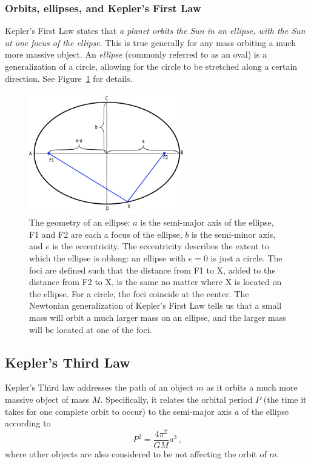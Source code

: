 \subsubsection{Orbits, ellipses, and Kepler's First Law}
Kepler's First Law states that \textit{a planet orbits the Sun in an ellipse, with the Sun at one focus of the ellipse}. This is true generally for any mass orbiting a much more massive object. An \textit{ellipse} (commonly referred to as an oval) is a generalization of a circle, allowing for the circle to be stretched along a certain direction. See Figure~\ref{gc:fig:ellipse} for details.

\begin{figure}
	\centering
	\includegraphics[width=0.6\textwidth]{galactic-center/ellipse.png}
	\caption{The geometry of an ellipse: $a$ is the semi-major axis of the ellipse, F1 and F2 are each a
		focus of the ellipse, $b$ is the semi-minor axis, and $e$ is the eccentricity. The eccentricity describes
		the extent to which the ellipse is oblong: an ellipse with $e = 0$ is just a circle. The foci are defined such
		that the distance from F1 to X, added to the distance from F2 to X, is the same no matter where X
		is located on the ellipse. For a circle, the foci coincide at the center. The Newtonian generalization of
		Kepler's First Law tells us that a small mass will orbit a much larger mass on an ellipse, and the larger
		mass will be located at one of the foci.}\label{gc:fig:ellipse}
\end{figure}

\subsection{Kepler's Third Law}

Kepler’s Third law addresses the path of an object $m$ as it orbits a much more massive object of mass $M$. Specifically, it relates the orbital period $P$ (the time it takes for one complete orbit to occur) to the semi-major axis $a$ of the ellipse according to
\begin{equation}\label{gc:eq:kepler-3}
P^2 = \frac{4 \pi^2}{G M} a^3 \,,
\end{equation}
where other objects are also considered to be not affecting the orbit of $m$. %

